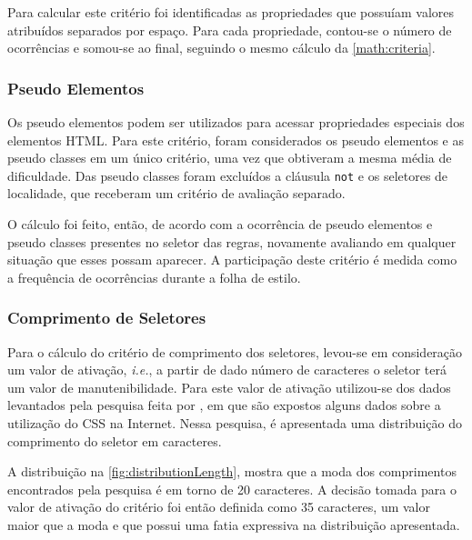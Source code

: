 Para calcular este critério foi identificadas as propriedades que possuíam valores atribuídos separados por espaço. Para cada propriedade, contou-se o número de ocorrências e somou-se ao final, seguindo o mesmo cálculo da \autoref{math:criteria}.

\subsubsection{Pseudo Elementos}
Os pseudo elementos podem ser utilizados para acessar propriedades especiais dos elementos HTML. Para este critério, foram considerados os pseudo elementos e as pseudo classes em um único critério, uma vez que obtiveram a mesma média de dificuldade. Das pseudo classes foram excluídos a cláusula \texttt{not} e os seletores de localidade, que receberam um critério de avaliação separado.

O cálculo foi feito, então, de acordo com a ocorrência de pseudo elementos e pseudo classes presentes no seletor das regras, novamente avaliando em qualquer situação que esses possam aparecer. A participação deste critério é medida como a frequência de ocorrências durante a folha de estilo.

\subsubsection{Comprimento de Seletores}
Para o cálculo do critério de comprimento dos seletores, levou-se em consideração um valor de ativação, \textit{i.e.}, a partir de dado número de caracteres o seletor terá um valor de manutenibilidade. Para este valor de ativação utilizou-se dos dados levantados pela pesquisa feita por , em que são expostos alguns dados sobre a utilização do CSS na Internet. Nessa pesquisa, é apresentada uma distribuição do comprimento do seletor em caracteres. 

A distribuição na \autoref{fig:distributionLength}, mostra que a moda dos comprimentos encontrados pela pesquisa é em torno de 20 caracteres. A decisão tomada para o valor de ativação do critério foi então definida como 35 caracteres, um valor maior que a moda e que possui uma fatia expressiva na distribuição apresentada.


